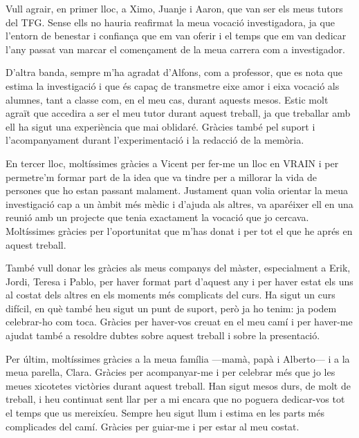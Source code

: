 
\thispagestyle{empty}
\vspace*{\fill}

\noindent\hfill
\begin{minipage}{0.65\textwidth}
\itshape
\raggedleft
\setlength{\parindent}{0pt}
\setlength{\parskip}{0.75\baselineskip}

Vull agrair, en primer lloc, a Ximo, Juanje i Aaron, que van ser els meus tutors del TFG. Sense ells no hauria reafirmat la meua vocació investigadora, ja que l'entorn de benestar i confiança que em van oferir i el temps que em van dedicar l'any passat van marcar el començament de la meua carrera com a investigador.

D'altra banda, sempre m'ha agradat d'Alfons, com a professor, que es nota que estima la investigació i que és capaç de transmetre eixe amor i eixa vocació als alumnes, tant a classe com, en el meu cas, durant aquests mesos. Estic molt agraït que accedira a ser el meu tutor durant aquest treball, ja que treballar amb ell ha sigut una experiència que mai oblidaré. Gràcies també pel suport i l'acompanyament durant l'experimentació i la redacció de la memòria.

En tercer lloc, moltíssimes gràcies a Vicent per fer-me un lloc en VRAIN i per permetre'm formar part de la idea que va tindre per a millorar la vida de persones que ho estan passant malament. Justament quan volia orientar la meua investigació cap a un àmbit més mèdic i d'ajuda als altres, va aparéixer ell en una reunió amb un projecte que tenia exactament la vocació que jo cercava. Moltíssimes gràcies per l'oportunitat que m'has donat i per tot el que he aprés en aquest treball.

També vull donar les gràcies als meus companys del màster, especialment a Erik, Jordi, Teresa i Pablo, per haver format part d'aquest any i per haver estat els uns al costat dels altres en els moments més complicats del curs. Ha sigut un curs difícil, en què també heu sigut un punt de suport, però ja ho tenim: ja podem celebrar-ho com toca. Gràcies per haver-vos creuat en el meu camí i per haver-me ajudat també a resoldre dubtes sobre aquest treball i sobre la presentació.

Per últim, moltíssimes gràcies a la meua família —mamà, papà i Alberto— i a la meua parella, Clara. Gràcies per acompanyar-me i per celebrar més que jo les meues xicotetes victòries durant aquest treball. Han sigut mesos durs, de molt de treball, i heu continuat sent llar per a mi encara que no poguera dedicar-vos tot el temps que us mereixíeu. Sempre heu sigut llum i estima en les parts més complicades del camí. Gràcies per guiar-me i per estar al meu costat.


\end{minipage}
\hspace*{0.07\textwidth}

\vspace*{\fill}
\clearpage